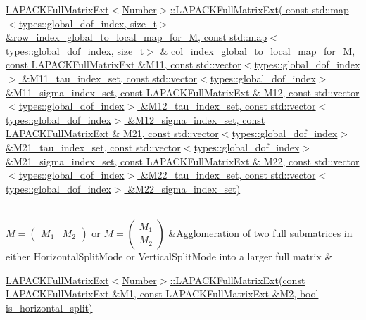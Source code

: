 \begin{longtabu}
\begin{DoxyItemize}
\item \hyperlink{classLAPACKFullMatrixExt_a4baa5d6642259df28cf9f32cb6b71a25}{L\+A\+P\+A\+C\+K\+Full\+Matrix\+Ext$<$\+Number$>$\+::\+L\+A\+P\+A\+C\+K\+Full\+Matrix\+Ext( const std\+::map$<$types\+::global\+\_\+dof\+\_\+index, size\+\_\+t$>$ \&row\+\_\+index\+\_\+global\+\_\+to\+\_\+local\+\_\+map\+\_\+for\+\_\+\+M, const std\+::map$<$types\+::global\+\_\+dof\+\_\+index, size\+\_\+t$>$ \& col\+\_\+index\+\_\+global\+\_\+to\+\_\+local\+\_\+map\+\_\+for\+\_\+\+M, const L\+A\+P\+A\+C\+K\+Full\+Matrix\+Ext \&\+M11, const std\+::vector$<$types\+::global\+\_\+dof\+\_\+index$>$ \&\+M11\+\_\+tau\+\_\+index\+\_\+set, const std\+::vector$<$types\+::global\+\_\+dof\+\_\+index$>$ \&\+M11\+\_\+sigma\+\_\+index\+\_\+set, const L\+A\+P\+A\+C\+K\+Full\+Matrix\+Ext \& M12, const std\+::vector$<$types\+::global\+\_\+dof\+\_\+index$>$ \&\+M12\+\_\+tau\+\_\+index\+\_\+set, const std\+::vector$<$types\+::global\+\_\+dof\+\_\+index$>$ \&\+M12\+\_\+sigma\+\_\+index\+\_\+set, const L\+A\+P\+A\+C\+K\+Full\+Matrix\+Ext \& M21, const std\+::vector$<$types\+::global\+\_\+dof\+\_\+index$>$ \&\+M21\+\_\+tau\+\_\+index\+\_\+set, const std\+::vector$<$types\+::global\+\_\+dof\+\_\+index$>$ \&\+M21\+\_\+sigma\+\_\+index\+\_\+set, const L\+A\+P\+A\+C\+K\+Full\+Matrix\+Ext \& M22, const std\+::vector$<$types\+::global\+\_\+dof\+\_\+index$>$ \&\+M22\+\_\+tau\+\_\+index\+\_\+set, const std\+::vector$<$types\+::global\+\_\+dof\+\_\+index$>$ \&\+M22\+\_\+sigma\+\_\+index\+\_\+set)}
\end{DoxyItemize}\\
$M = \begin{pmatrix} M_1 & M_2 \end{pmatrix}$ or $M = \begin{pmatrix} M_1 \\ M_2 \end{pmatrix}$ &Agglomeration of two full submatrices in either {\ttfamily Horizontal\+Split\+Mode} or {\ttfamily Vertical\+Split\+Mode} into a larger full matrix &
\begin{DoxyItemize}
\item \hyperlink{classLAPACKFullMatrixExt_a98851864591035df275caca76e07ebe3}{L\+A\+P\+A\+C\+K\+Full\+Matrix\+Ext$<$\+Number$>$\+::\+L\+A\+P\+A\+C\+K\+Full\+Matrix\+Ext(const L\+A\+P\+A\+C\+K\+Full\+Matrix\+Ext \&\+M1, const L\+A\+P\+A\+C\+K\+Full\+Matrix\+Ext \&\+M2, bool is\+\_\+horizontal\+\_\+split)}

\end{DoxyItemize}
\end{longtabu}

